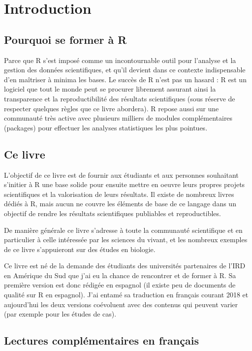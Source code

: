 \documentclass[]{book}
\theoremstyle{definition}
\theoremstyle{definition}
\theoremstyle{definition}
\theoremstyle{remark}
\begin{document}
\chapter{Introduction}\label{intro}

\section{Pourquoi se former à R}\label{pourquoi-se-former-a-r}

Parce que R s'est imposé comme un incontournable outil pour l'analyse et
la gestion des données scientifiques, et qu'il devient dans ce contexte
indispensable d'en maîtriser à minima les bases. Le succès de R n'est
pas un hasard : R est un logiciel que tout le monde peut se procurer
librement assurant ainsi la transparence et la reproductibilité des
résultats scientifiques (sous réserve de respecter quelques règles que
ce livre abordera). R repose aussi sur une communauté très active avec
plusieurs milliers de modules complémentaires (packages) pour effectuer
les analyses statistiques les plus pointues.

\section{Ce livre}\label{ce-livre}

L'objectif de ce livre est de fournir aux étudiants et aux personnes
souhaitant s'initier à R une base solide pour ensuite mettre en oeuvre
leurs propres projets scientifiques et la valorisation de leurs
résultats. Il existe de nombreux livres dédiés à R, mais aucun ne couvre
les éléments de base de ce langage dans un objectif de rendre les
résultats scientifiques publiables et reproductibles.

De manière générale ce livre s'adresse à toute la communauté
scientifique et en particulier à celle intéressée par les sciences du
vivant, et les nombreux exemples de ce livre s'appuieront sur des études
en biologie.

Ce livre est né de la demande des étudiants des universités partenaires
de l'IRD en Amérique du Sud que j'ai eu la chance de rencontrer et de
former à R. Sa première version est donc rédigée en espagnol (il existe
peu de documents de qualité sur R en espagnol). J'ai entamé sa
traduction en français courant 2018 et aujourd'hui les deux versions
coévoluent avec des contenus qui peuvent varier (par exemple pour les
études de cas).

\section{Lectures complémentaires en
français}\label{lectures-complementaires-en-francais}
\end{document}
